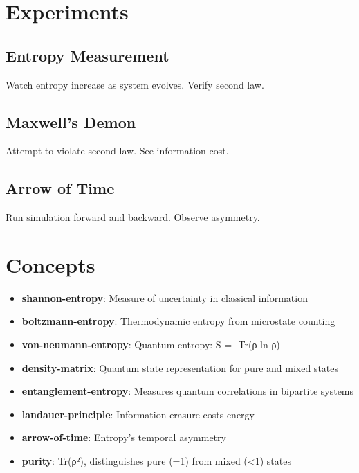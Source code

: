 \documentclass[
  11pt,
  letterpaper,
  twoside,
  openright]{book}
\providecommand{\tightlist}{%
  \setlength{\itemsep}{0pt}\setlength{\parskip}{0pt}}
\begin{document}
\section{Experiments}\label{experiments-38}

\subsection{Entropy Measurement}\label{entropy-measurement}

Watch entropy increase as system evolves. Verify second law.

\subsection{Maxwell's Demon}\label{maxwells-demon}

Attempt to violate second law. See information cost.

\subsection{Arrow of Time}\label{arrow-of-time}

Run simulation forward and backward. Observe asymmetry.

\section{Concepts}\label{concepts-39}

\begin{itemize}
\tightlist
\item
  \textbf{shannon-entropy}: Measure of uncertainty in classical
  information
\item
  \textbf{boltzmann-entropy}: Thermodynamic entropy from microstate
  counting
\item
  \textbf{von-neumann-entropy}: Quantum entropy: S = -Tr(ρ ln ρ)
\item
  \textbf{density-matrix}: Quantum state representation for pure and
  mixed states
\item
  \textbf{entanglement-entropy}: Measures quantum correlations in
  bipartite systems
\item
  \textbf{landauer-principle}: Information erasure costs energy
\item
  \textbf{arrow-of-time}: Entropy's temporal asymmetry
\item
  \textbf{purity}: Tr(ρ²), distinguishes pure (=1) from mixed
  (\textless1) states
\end{itemize}
\end{document}
